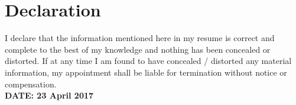 \documentclass[10pt,a4paper,sans]{moderncv} %
\begin{document}


\section{Declaration}
 I declare that the information mentioned here in my resume is correct and complete to the best of my knowledge and nothing has been concealed or distorted. 
If at any time I am found to have concealed / distorted any material information, my appointment shall be liable for termination without notice or compensation. \\


\textbf{DATE: 23 April 2017}
\end{document}
